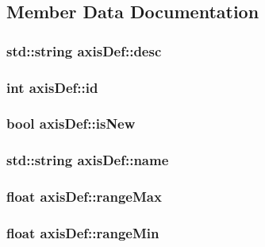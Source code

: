 \subsection{Member Data Documentation}
\hypertarget{structaxisDef_a2cb1c26f0d063ce888d83393c672d6d3}{
\subsubsection[{desc}]{\setlength{\rightskip}{0pt plus 5cm}std\-::string axis\-Def\-::desc}}\label{structaxisDef_a2cb1c26f0d063ce888d83393c672d6d3}
\hypertarget{structaxisDef_a1d36c9abefe4d6788f325ebc5278a8e8}{
\subsubsection[{id}]{\setlength{\rightskip}{0pt plus 5cm}int axis\-Def\-::id}}\label{structaxisDef_a1d36c9abefe4d6788f325ebc5278a8e8}
\hypertarget{structaxisDef_aea953fb050c60d7260882239ca0672f2}{
\subsubsection[{is\-New}]{\setlength{\rightskip}{0pt plus 5cm}bool axis\-Def\-::is\-New}}\label{structaxisDef_aea953fb050c60d7260882239ca0672f2}
\hypertarget{structaxisDef_aad90dd24f442707e3c5cbc9a63ace2ac}{
\subsubsection[{name}]{\setlength{\rightskip}{0pt plus 5cm}std\-::string axis\-Def\-::name}}\label{structaxisDef_aad90dd24f442707e3c5cbc9a63ace2ac}
\hypertarget{structaxisDef_ae5b71d00e16d1270d602eaedd2e5ec88}{
\subsubsection[{range\-Max}]{\setlength{\rightskip}{0pt plus 5cm}float axis\-Def\-::range\-Max}}\label{structaxisDef_ae5b71d00e16d1270d602eaedd2e5ec88}
\hypertarget{structaxisDef_a82d8f9c129ca390eb253d2231ce6b8f3}{
\subsubsection[{range\-Min}]{\setlength{\rightskip}{0pt plus 5cm}float axis\-Def\-::range\-Min}}\label{structaxisDef_a82d8f9c129ca390eb253d2231ce6b8f3}
